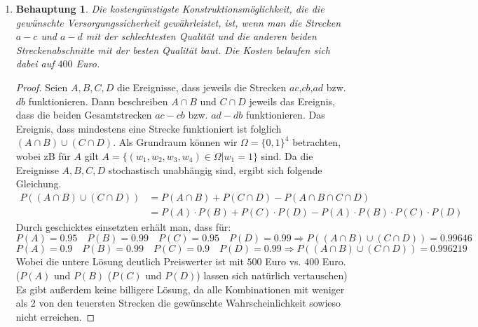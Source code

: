 \documentclass[a4paper]{scrartcl}
\newtheorem*{behaupt}{Behauptung}
\begin{document}
\begin{enumerate}[label=\bfseries\arabic*.]
    \item
                
                \begin{behaupt}
                	Die kostengünstigste Konstruktionsmöglichkeit,
					die die gewünschte Versorgungssicherheit gewährleistet,
					ist, wenn man die Strecken $a-c$ und $a-d$ mit der schlechtesten Qualität und
					die anderen beiden Streckenabschnitte mit der besten Qualität baut. Die Kosten
					belaufen sich dabei auf $400$ Euro.     
                \end{behaupt}
                \begin{proof}
                	Seien $A,B,C,D$ die Ereignisse, dass jeweils die Strecken
					$ac$,$cb$,$ad$ bzw. $db$ funktionieren. Dann beschreiben $A\cap B$ und 
					$C\cap D$ jeweils das Ereignis, dass die beiden Gesamtstrecken $ac-cb$ bzw.
					$ad-db$ funktionieren. Das Ereignis, dass mindestens eine Strecke
					funktioniert ist folglich $(A\cap B)\cup (C\cap D)$.
					Als Grundraum können wir $\Omega=\{0,1\}^4$ betrachten, wobei zB für $A$
					gilt $A=\{(w_1,w_2,w_3,w_4)\in\Omega|w_1=1\}$ sind. Da die Ereignisse
					$A,B,C,D$ stochastisch unabhängig sind, ergibt sich folgende Gleichung.
					\begin{align*}
					P((A\cap B)\cup (C\cap D))
					&=P(A\cap B)+P(C\cap D)-P(A\cap B\cap C\cap D)\\
					&=P(A)\cdot P(B)+P(C)\cdot P(D)-P(A)\cdot P(B)\cdot P(C)\cdot P(D)
					\end{align*}
					Durch geschicktes einsetzten erhält man, dass für:\\
					$P(A)=0.95\quad P(B)=0.99 \quad P(C)=0.95 \quad P(D)=0.99 \Rightarrow
					P((A\cap B)\cup (C\cap D))=0.99646$\\
					$P(A)=0.9\quad P(B)=0.99 \quad P(C)=0.9 \quad P(D)=0.99 \Rightarrow
					P((A\cap B)\cup (C\cap D))=0.996219$\\
					Wobei die untere Lösung deutlich Preiswerter ist mit $500$ Euro vs. $400$ Euro.\\
					($P(A)$ und $P(B)$ ($P(C)$ und $P(D)$) lassen sich natürlich vertauschen)
					Es gibt außerdem keine 
					billigere Lösung, da alle Kombinationen mit weniger als 2 von den 
					teuersten Strecken die gewünschte Wahrscheinlichkeit sowieso nicht erreichen.    
                \end{proof}

                

\end{enumerate}
\end{document}
